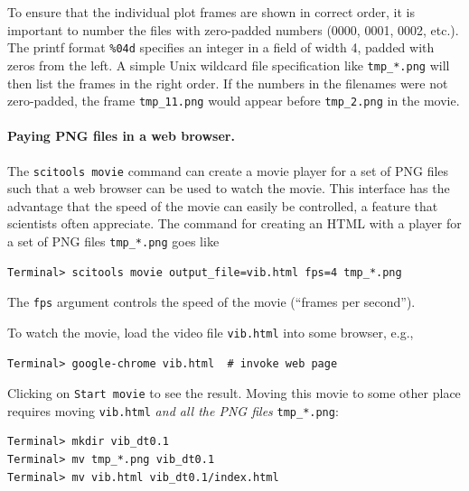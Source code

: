 \documentclass[%
oneside,                 %
final,                   %
10pt]{article}
\newenvironment{warning_mdfboxadmon}[1][]{
\begin{warning_mdfboxmdframed}[frametitle=#1]
}
{
\end{warning_mdfboxmdframed}
}
\begin{document}
\begin{warning_mdfboxadmon}
To ensure that the individual plot frames are shown in correct order,
it is important to number the files with zero-padded numbers
(0000, 0001, 0002, etc.). The printf format \Verb!%04d! specifies an
integer in a field of width 4, padded with zeros from the left.
A simple Unix wildcard file specification like \Verb!tmp_*.png!
will then list the frames in the right order. If the numbers in the
filenames were not zero-padded, the frame \Verb!tmp_11.png! would appear
before \Verb!tmp_2.png! in the movie.
\end{warning_mdfboxadmon}



\paragraph{Paying PNG files in a web browser.}

The \texttt{scitools movie} command can create a movie player for a set
of PNG files such that a web browser can be used to watch the movie.
This interface has the advantage that the speed of the movie can
easily be controlled, a feature that scientists often appreciate.
The command for creating an HTML with a player for a set of
PNG files \Verb!tmp_*.png! goes like

\begin{Verbatim}[frame=lines,label=\fbox{{\tiny Terminal}},framesep=2.5mm,framerule=0.7pt,fontsize=\fontsize{9pt}{9pt}]
Terminal> scitools movie output_file=vib.html fps=4 tmp_*.png
\end{Verbatim}
The \texttt{fps} argument controls the speed of the movie (``frames per second'').

To watch the movie, load the video file \texttt{vib.html} into some browser, e.g.,
\begin{Verbatim}[frame=lines,label=\fbox{{\tiny Terminal}},framesep=2.5mm,framerule=0.7pt,fontsize=\fontsize{9pt}{9pt}]
Terminal> google-chrome vib.html  # invoke web page
\end{Verbatim}
Clicking on \texttt{Start movie} to see the result. Moving this movie to
some other place requires moving \texttt{vib.html} \emph{and all the PNG files}
\Verb!tmp_*.png!:
\begin{Verbatim}[frame=lines,label=\fbox{{\tiny Terminal}},framesep=2.5mm,framerule=0.7pt,fontsize=\fontsize{9pt}{9pt}]
Terminal> mkdir vib_dt0.1
Terminal> mv tmp_*.png vib_dt0.1
Terminal> mv vib.html vib_dt0.1/index.html
\end{Verbatim}
\end{document}

